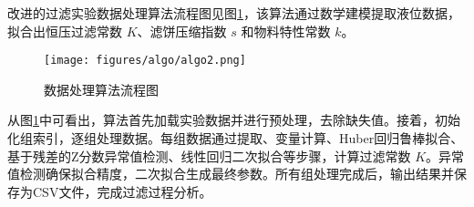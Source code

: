 改进的过滤实验数据处理算法流程图见图\ref{fig:algo2}，该算法通过数学建模提取液位数据，拟合出恒压过滤常数 $K$、滤饼压缩指数 $s$ 和物料特性常数 $k$。

\begin{figure}[H]
    \centering
    \texttt{[image: figures/algo/algo2.png]}
    \caption{数据处理算法流程图}
    \label{fig:algo2}
\end{figure}

从图\ref{fig:algo2}中可看出，算法首先加载实验数据并进行预处理，去除缺失值。接着，初始化组索引，逐组处理数据。每组数据通过提取、变量计算、Huber回归鲁棒拟合、基于残差的Z分数异常值检测、线性回归二次拟合等步骤，计算过滤常数 $K$。异常值检测确保拟合精度，二次拟合生成最终参数。所有组处理完成后，输出结果并保存为CSV文件，完成过滤过程分析。